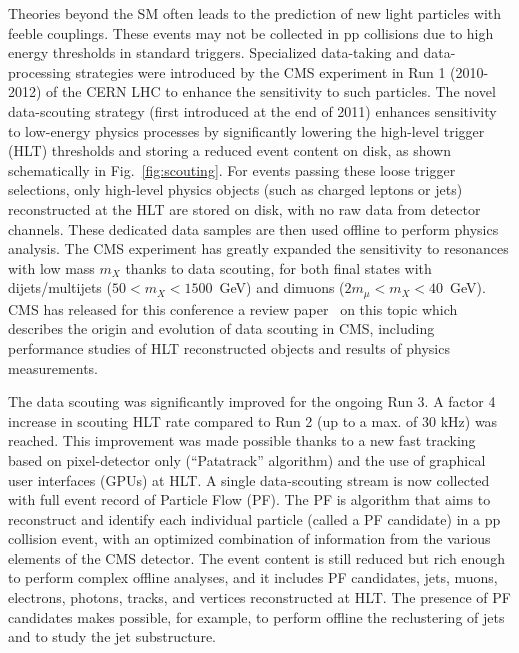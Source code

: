 \documentclass{moriond}
\begin{document}
Theories beyond the SM often leads to the prediction of new light
particles with feeble couplings. These events may not be collected in
pp collisions due to high energy thresholds in standard triggers. Specialized data-taking and
data-processing strategies were introduced by the CMS experiment in
Run 1 (2010-2012) of the CERN LHC to enhance the sensitivity to such
particles. The novel data-scouting strategy (first introduced at the end of 2011) enhances sensitivity to
low-energy physics processes by significantly lowering the high-level
trigger (HLT) thresholds and storing a reduced event content on disk,
as shown schematically in Fig.~\ref{fig:scouting}.
For events passing these loose trigger selections, only high-level physics
objects (such as charged leptons or jets) reconstructed at the HLT are stored
on disk, with no raw data from detector channels. These dedicated data
samples are then used offline to perform physics analysis. The CMS experiment has greatly expanded the sensitivity to
resonances with low mass $m_X$ thanks to data scouting, for both final
states with dijets/multijets ($50<m_X<1500$~GeV) and dimuons ($2m_{\mu}<m_X<40$~GeV).
CMS has released for this conference a review paper~\cite{CMS:2024zhe}
on this topic which describes the origin and evolution of data scouting in CMS, including
performance studies of HLT reconstructed objects and results of physics measurements.

The data scouting was significantly improved for the ongoing Run 3. A factor 4
increase in scouting HLT rate compared to Run 2 (up to a max. of 30
kHz) was reached. This improvement was made possible thanks to a new fast tracking based on pixel-detector
only (``Patatrack'' algorithm) and the use of graphical user interfaces (GPUs) at HLT.
A single data-scouting stream is now collected with full event record
of Particle Flow (PF). The PF is algorithm that aims to reconstruct and
identify each individual particle (called a PF candidate) in a pp collision event,
with an optimized combination of information from the various elements
of the CMS detector. The event content is still reduced but rich enough to
perform complex offline analyses, and it includes PF candidates, jets, muons,
electrons, photons, tracks, and vertices reconstructed at HLT. The
presence of PF candidates makes possible, for example, to perform offline
the reclustering of jets and to study the jet substructure.
\end{document}
